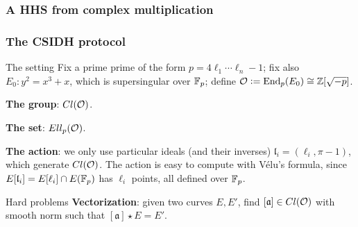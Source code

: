\documentclass{beamer}
\begin{document}
    \begin{frame}
    \frametitle{A HHS from complex multiplication}
    
    \begin{center}
    \end{center}
    
    \end{frame}


    \begin{frame}
        \frametitle{The CSIDH protocol}
        
        \begin{block}{The setting}
            Fix a prime prime of the form $p=4\ell_1\cdots\ell_n-1$; fix also $E_0:y^2=x^3+x$, which is supersingular over $\mathbb{F}_p$; define $\mathcal{O}:=\operatorname{End}_p(E_0)\cong\mathbb{Z}[\sqrt{-p}]$.
            
            \textbf{The group}: $Cl(\mathcal{O})$.
            
            \textbf{The set}: $Ell_p(\mathcal{O})$.
            
            \textbf{The action}: we only use particular ideals (and their inverses) $\mathfrak{l}_i=(\ell_i,\pi-1)$, which generate $Cl(\mathcal{O})$. The action is easy to compute with Vélu's formula, since $E[\mathfrak{l}_i]=E[\ell_i]\cap E(\mathbb{F}_p)$ has $\ell_i$ points, all defined over $\mathbb{F}_p$.
        \end{block}
    
        \begin{block}{Hard problems}
            \textbf{Vectorization}: given two curves $E,E'$, find $[\mathfrak{a}]\in Cl(\mathcal{O})$ with smooth norm such that $[\mathfrak{a}]\star E = E'$.       
        \end{block}
    
    \end{frame}
\end{document}

